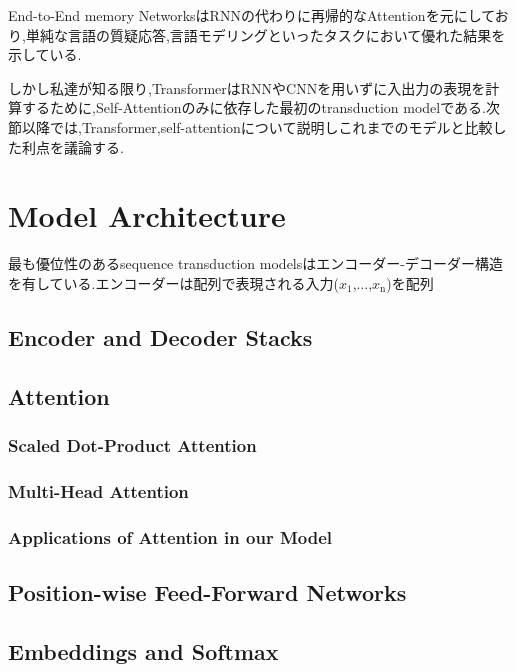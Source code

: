 \documentclass[twocolumn]{jarticle}     %
\begin{document}
End-to-End memory NetworksはRNNの代わりに再帰的なAttentionを元にしており,単純な言語の質疑応答,言語モデリングといったタスクにおいて優れた結果を示している.\par

しかし私達が知る限り,TransformerはRNNやCNNを用いずに入出力の表現を計算するために,Self-Attentionのみに依存した最初のtransduction modelである.次節以降では,Transformer,self-attentionについて説明しこれまでのモデルと比較した利点を議論する.




\section{Model Architecture}
最も優位性のあるsequence transduction modelsはエンコーダー-デコーダー構造を有している.エンコーダーは配列で表現される入力($x_\mathrm{1}$,...,$x_\mathrm{n}$)を配列

\subsection{Encoder and Decoder Stacks}

\subsection{Attention}

\subsubsection{Scaled Dot-Product Attention}

\subsubsection{Multi-Head Attention}

\subsubsection{Applications of Attention in our Model}

\subsection{Position-wise Feed-Forward Networks}

\subsection{Embeddings and Softmax}
\end{document}
